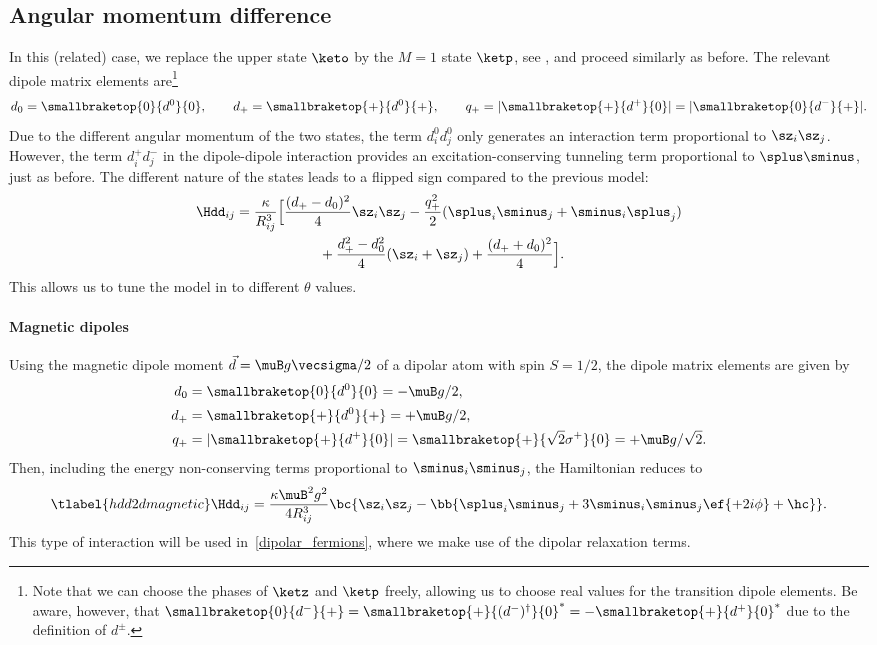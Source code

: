 \subsection{Angular momentum difference}
In this (related) case, we replace the upper state $\keto$ by the $M=1$ state $\ketp$, see , and proceed similarly as before.
The relevant dipole matrix elements are\footnote{Note that we can choose the phases of $\ketz$ and $\ketp$ freely, allowing us to choose real values for the transition dipole elements. Be aware, however, that $\smallbraketop{0}{d^-}{+} = \smallbraketop{+}{(d^-)^\dag}{0}^* = -\smallbraketop{+}{d^+}{0}^*$ due to the definition of $d^\pm$.}
\begin{align}
    d_0 = \smallbraketop{0}{d^0}{0},\qquad
    d_+ = \smallbraketop{+}{d^0}{+},\qquad
    q_+ = |\smallbraketop{+}{d^+}{0}| = |\smallbraketop{0}{d^-}{+}|.
\end{align}
Due to the different angular momentum of the two states, the term $d^0_i d^0_j$ only generates an interaction term proportional to $\sz_i \sz_j$. However, the term $d^+_i d^-_j$ in the dipole-dipole interaction provides an excitation-conserving tunneling term proportional to $\splus\sminus$, just as before. The different nature of the states leads to a flipped sign compared to the previous model:
\begin{align}
    \Hdd_{ij} &= \frac{\kappa}{R_{ij}^3} \Big[ \frac{(d_+-d_0)^2}{4} \sz_i \sz_j  - \frac{q_+^2}{2} (\splus_i \sminus_j + \sminus_i \splus_j) \\
              &\qquad\qquad\qquad + \frac{d_+^2 - d_0^2}{4} (\sz_i + \sz_j)  + \frac{(d_++d_0)^2}{4} \Big].
\end{align}
This allows us to tune the model in  to different $\theta$ values.

\paragraph{Magnetic dipoles}
Using the magnetic dipole moment $\vec{d}=\muB g \vecsigma / 2$ of a dipolar atom with spin $S=1/2$,
the dipole matrix elements are given by
\begin{align}
    d_0 &= \smallbraketop{0}{d^0}{0} = -\muB g/2, \vphantom{\sqrt{2}} \\
    d_+ &= \smallbraketop{+}{d^0}{+} = +\muB g/2, \vphantom{\sqrt{2}} \\
    q_+ &= |\smallbraketop{+}{d^+}{0}| = \smallbraketop{+}{\sqrt{2} \sigma^+}{0} = +\muB g/\sqrt{2}.
\end{align}
Then, including the energy non-conserving terms proportional to $\sminus_i\sminus_j$, the Hamiltonian reduces to
\begin{align} \tlabel{hdd2dmagnetic}
    \Hdd_{ij} = \frac{\kappa \muB^2 g^2}{4 R_{ij}^3} \bc{ \sz_i \sz_j - \bb{\splus_i \sminus_j+ 3 \sminus_i\sminus_j \ef{+2i\phi} + \hc } }.
\end{align}
This type of interaction will be used in~\cref{dipolar_fermions}, where we make use of the dipolar relaxation terms.


